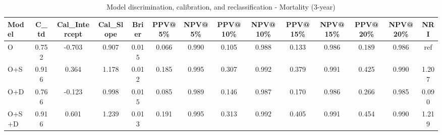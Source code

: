 \begin{table}[htbp]
\centering
\small
\caption{Model discrimination, calibration, and reclassification - Mortality (3-year)}
\label{tab:perf_mortality_3y}
\begin{tabular}{lccccccccccccc}
\toprule
Model & C\_td & Cal\_Intercept & Cal\_Slope & Brier & PPV@5\% & NPV@5\% & PPV@10\% & NPV@10\% & PPV@15\% & NPV@15\% & PPV@20\% & NPV@20\% & NRI \\
\midrule
O & 0.752 & -0.703 & 0.907 & 0.015 & 0.066 & 0.990 & 0.105 & 0.988 & 0.133 & 0.986 & 0.189 & 0.986 & ref \\
O+S & 0.916 & 0.364 & 1.178 & 0.012 & 0.185 & 0.995 & 0.307 & 0.992 & 0.379 & 0.991 & 0.425 & 0.990 & 1.207 \\
O+D & 0.766 & -0.123 & 0.998 & 0.015 & 0.085 & 0.989 & 0.146 & 0.987 & 0.170 & 0.986 & 0.266 & 0.985 & 0.090 \\
O+S+D & 0.916 & 0.601 & 1.239 & 0.013 & 0.191 & 0.995 & 0.313 & 0.992 & 0.405 & 0.991 & 0.454 & 0.990 & 1.219 \\
\bottomrule
\end{tabular}
\end{table}